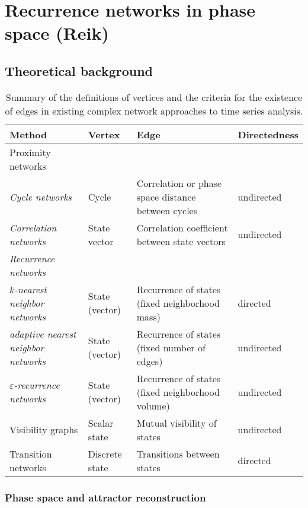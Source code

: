 \section{Recurrence networks in phase space {\bf{(Reik)}}}
	\subsection{Theoretical background}

\begin{table}[t]%
\caption{Summary of the definitions of vertices and the criteria for the
existence of edges in existing complex network approaches to time series analysis.}{
\small
\begin{tabular}{llll}
\hline
Method & Vertex & Edge & Directedness \\
\hline
Proximity networks & & \\
\textit{Cycle networks} & Cycle & Correlation or phase space distance between cycles & undirected \\
\textit{Correlation networks} & State vector & Correlation coefficient between state vectors & undirected \\
\textit{Recurrence networks} & & & \\
\quad \textit{$k$-nearest neighbor networks}& State (vector) & Recurrence of states (fixed neighborhood mass) & directed \\
\quad \textit{adaptive nearest neighbor networks}& State (vector)  & Recurrence of states (fixed number of edges) & undirected \\
\quad \textit{$\varepsilon$-recurrence networks} & State (vector) & Recurrence of states (fixed neighborhood volume) & undirected \\
\hline
Visibility graphs & Scalar state & Mutual visibility of states & undirected \\
\hline
Transition networks & Discrete state & Transitions between states & directed \\
\hline
\end{tabular}
\normalsize
\label{tab:methods}}
\end{table}


		\subsubsection{Phase space and attractor reconstruction}
